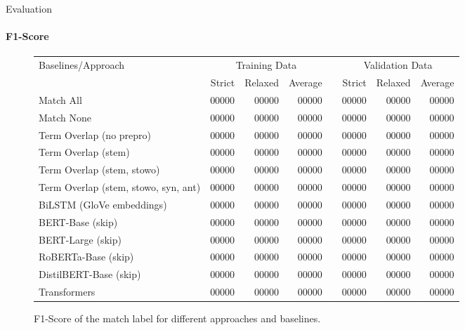 \documentclass[english,handout]{mlutalk}
\begin{document}
\begin{frame}{Evaluation}
  \framesubtitle{F1-Score}
  \begin{figure}
    \centering
    \caption{F1-Score of the match label for different approaches and baselines.}
    \tiny
    \begin{tabular}{lrrrlrrr}
      \toprule
      Baselines/Approach & \multicolumn{3}{c}{Training Data} & & \multicolumn{3}{c}{Validation Data}\\ \cmidrule{2-4} \cmidrule{6-8}
        & Strict & Relaxed & Average & & Strict & Relaxed & Average\\
      \midrule
      Match All                           & 00000 & 00000 & 00000 & & 00000 & 00000 & 00000\\
      Match None                          & 00000 & 00000 & 00000 & & 00000 & 00000 & 00000\\
      Term Overlap (no prepro)            & 00000 & 00000 & 00000 & & 00000 & 00000 & 00000\\
      Term Overlap (stem)                 & 00000 & 00000 & 00000 & & 00000 & 00000 & 00000\\
      Term Overlap (stem, stowo)          & 00000 & 00000 & 00000 & & 00000 & 00000 & 00000\\
      Term Overlap (stem, stowo, syn, ant)& 00000 & 00000 & 00000 & & 00000 & 00000 & 00000\\
      \midrule
      BiLSTM (GloVe embeddings)           & 00000 & 00000 & 00000 & & 00000 & 00000 & 00000\\
      BERT-Base (skip)                    & 00000 & 00000 & 00000 & & 00000 & 00000 & 00000\\
      BERT-Large (skip)                   & 00000 & 00000 & 00000 & & 00000 & 00000 & 00000\\
      RoBERTa-Base (skip)                 & 00000 & 00000 & 00000 & & 00000 & 00000 & 00000\\
      DistilBERT-Base (skip)              & 00000 & 00000 & 00000 & & 00000 & 00000 & 00000\\
      Transformers                        & 00000 & 00000 & 00000 & & 00000 & 00000 & 00000\\
      \bottomrule
    \end{tabular}
  \end{figure}
\end{frame}
\end{document}
